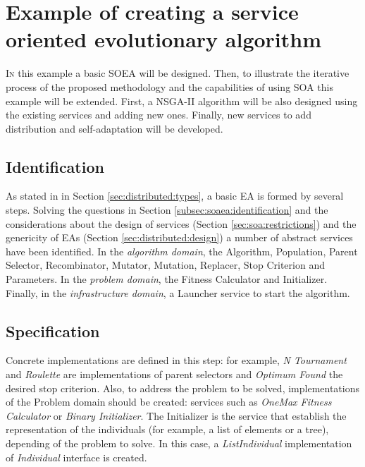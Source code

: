 \section{Example of creating a service oriented evolutionary algorithm}
\label{sec:soaea:creating}
 
\lettrine{I}{n} this example a basic SOEA will be designed. Then, to illustrate the iterative process of the proposed methodology and the capabilities of using SOA this example will be extended. First, a NSGA-II algorithm \cite{NSGA2} will be also designed using the existing services and adding new ones. Finally, new services to add distribution and self-adaptation will be developed. 

\subsection{Identification}
As  stated in in Section \ref{sec:distributed:types}, a basic EA is formed by several steps. Solving the questions in Section \ref{subsec:soaea:identification} and the considerations about the design of services (Section \ref{sec:soa:restrictions}) and the genericity of EAs (Section \ref{sec:distributed:design}) a number of abstract services have been identified. In the {\em algorithm domain}, the Algorithm, Population, Parent Selector, Recombinator, Mutator, Mutation, Replacer, Stop Criterion and Parameters. In the {\em problem domain}, the Fitness Calculator and Initializer. Finally, in the {\em infrastructure domain}, a Launcher service to start the algorithm. %



\subsection{Specification}

 Concrete implementations are defined in this step: for example, {\em N Tournament} and {\em Roulette} are implementations of parent selectors and {\em Optimum Found} the desired stop criterion. Also, to address the problem to be solved, implementations of the Problem domain should be created: services such as {\em OneMax Fitness Calculator} or {\em Binary Initializer}. The Initializer is the service that establish the representation of the individuals (for example, a list of elements or a tree), depending of the problem to solve. In this case, a {\em ListIndividual} implementation of {\em Individual} interface is created.

